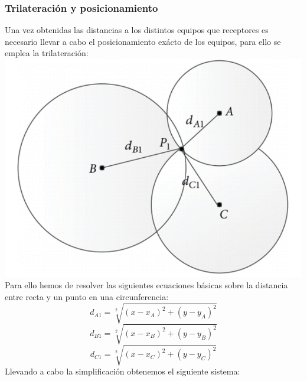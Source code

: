 \documentclass[a4paper ,12pt, onecolumn]{article}
\begin{document}
            \subsubsection{Trilateración y posicionamiento}
                Una vez obtenidas las distancias a los distintos equipos que receptores es necesario llevar a cabo el
                posicionamiento exácto de los equipos, para ello se emplea la trilateración:
                \includegraphics[scale=0.3]{trilateration_circle.png}
                Para ello hemos de resolver las siguientes ecuaciones básicas sobre la distancia entre recta y un punto en 
                    una circunferencia:
                    \begin{equation}
                        d_{A1}= \sqrt[2]{(x-x_A)^2+(y-y_A)^2}
                    \end{equation}
                    \begin{equation}
                        d_{B1}= \sqrt[2]{(x-x_B)^2+(y-y_B)^2}
                    \end{equation}
                    \begin{equation}
                        d_{C1}= \sqrt[2]{(x-x_C)^2+(y-y_C)^2}
                    \end{equation}
                    Llevando a cabo la simplificación obtenemos el siguiente sistema:
\end{document}
